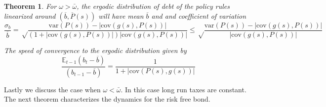 \documentclass[thmsb,11pt]{article}
\newtheorem{theorem}{Theorem}
\newcommand{\EE}{\mathbb E}
\newcommand{\var}{\mathrm{var}}
\newcommand{\cov}{\mathrm{cov}}
\begin{document}
\begin{theorem}
For $\omega>\bar{\omega}$, the ergodic distribution of debt of the policy rules linearized around $(\overline b, \overline{P}(s))$ will have mean $\overline b$ and and coefficient of variation
	\[
		\frac{\sigma_b}{\overline b} = \sqrt\frac{\var(P(s)) - |\cov(g(s),P(s))|}{(1+|\cov(g(s),P(s))|)|\cov(g(s),P(s))|}\leq\sqrt\frac{\var(P(s)) - |\cov(g(s),P(s))|}{|\cov(g(s),P(s))|}
	\]

	The speed of convergence to the ergodic distribution given by
	\[
		\frac{\EE_{t-1}(b_t-\overline b)}{(b_{t-1} - \overline b)} = \frac1{1+|\cov(P(s),g(s))|}
	\]


\end{theorem}

Lastly we discuss the case when $\omega < \bar{\omega}$. In this case long run taxes are constant. The next theorem characterizes the dynamics for the risk free bond. 
\end{document}
